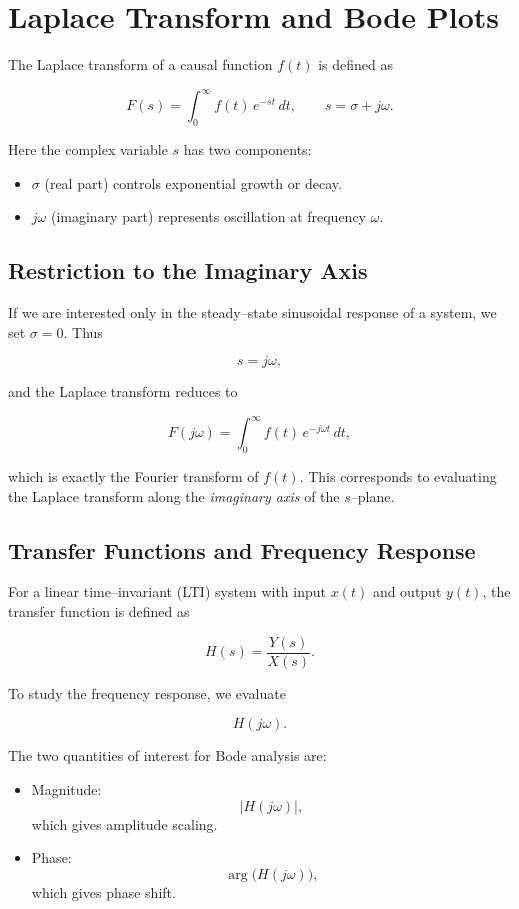 \documentclass[a4paper,12pt]{article}
\begin{document}
	
	\section*{Laplace Transform and Bode Plots}
	
	The Laplace transform of a causal function $f(t)$ is defined as
	
	$$
	F(s) = \int_{0}^{\infty} f(t)\, e^{-st}\, dt, 
	\qquad s = \sigma + j\omega.
	$$
	
	Here the complex variable $s$ has two components:
	\begin{itemize}
		\item $\sigma$ (real part) controls exponential growth or decay.
		\item $j\omega$ (imaginary part) represents oscillation at frequency $\omega$.
	\end{itemize}
	
	\subsection*{Restriction to the Imaginary Axis}
	
	If we are interested only in the steady--state sinusoidal response of a system, 
	we set $\sigma = 0$. Thus
	
	$$
	s = j\omega,
	$$
	
	and the Laplace transform reduces to
	
	$$
	F(j\omega) = \int_{0}^{\infty} f(t)\, e^{-j\omega t}\, dt,
	$$
	
	which is exactly the Fourier transform of $f(t)$.  
	This corresponds to evaluating the Laplace transform along the \emph{imaginary axis} of the $s$--plane.
	
	\subsection*{Transfer Functions and Frequency Response}
	
	For a linear time--invariant (LTI) system with input $x(t)$ and output $y(t)$, 
	the transfer function is defined as
	
	$$
	H(s) = \frac{Y(s)}{X(s)}.
	$$
	
	To study the frequency response, we evaluate
	
	$$
	H(j\omega).
	$$
	
	The two quantities of interest for Bode analysis are:
	\begin{itemize}
		\item Magnitude: 
		$$
		|H(j\omega)|,
		$$
		which gives amplitude scaling.
		\item Phase: 
		$$
		\arg \big( H(j\omega) \big),
		$$
		which gives phase shift.
	\end{itemize}
	
\end{document}
